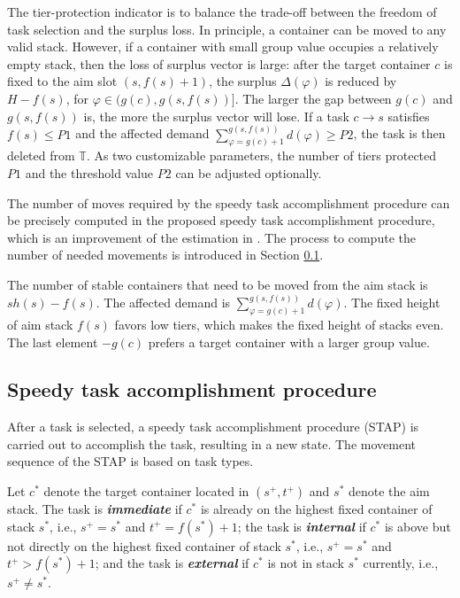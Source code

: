 \documentclass[review,3p,times,12pt,number]{elsarticle}\usepackage{amsmath}\usepackage{amssymb}
\renewcommand{\citet}[1]{\citeauthor{#1} \citep{#1}}
\renewcommand{\emph}[1]{\textbf{\textit{#1}}}
\begin{document}
The tier-protection indicator is to balance the trade-off between the freedom of task selection and the surplus loss. In principle, a container can be moved to any valid stack.
However, if a container with small group value occupies a relatively empty stack, then the loss of surplus vector is large: after the target container $c$ is fixed to the aim slot $(s,f(s)+1)$, the surplus $\Delta(\varphi)$ is reduced by $H-f(s)$, for $\varphi\in (g(c),g(s,f(s))]$.
The larger the gap between $g(c)$ and $g(s,f(s))$ is, the more the surplus vector will lose.
If a task $c\rightarrow s$ satisfies $f(s)\le P1$ and the affected demand $\sum_{\varphi=g(c)+1}^{g(s,f(s))}d(\varphi)\ge P2$,  the task is then deleted from $\mathbb{T}$. As two customizable parameters, the number of tiers protected $P1$ and the threshold value $P2$ can be adjusted optionally.

The number of moves required by the speedy task accomplishment procedure can be precisely computed in the proposed speedy task accomplishment procedure, which is an improvement of the estimation in \citet{wang2015}.
The process to compute the number of needed movements is introduced in Section \ref{sec:speedy}.

The number of stable containers that need to be moved from the aim stack is $\mathit{sh}(s)-f(s)$.
The affected demand is $\sum_{\varphi=g(c)+1}^{g(s,f(s))}d(\varphi)$.
The fixed height of aim stack $f(s)$ favors low tiers, which makes the fixed height of stacks even.
The last element $-g(c)$ prefers a target container with a larger group value.


\subsection{Speedy task accomplishment procedure}

\label{sec:speedy}
After a task is selected, a speedy task accomplishment procedure (STAP) is carried out to accomplish the task, resulting in a new state. The movement sequence of the STAP is based on task types.

Let $c^*$ denote the target container located in $(s^+,t^+)$ and $s^*$ denote the aim stack. The task is \emph{immediate} if $c^*$ is already on the highest fixed container of stack $s^*$, i.e., $s^+=s^*$ and $t^+=f(s^*)+1$;
the task is \emph{internal} if $c^*$ is above but not directly on the highest fixed container of stack $s^*$, i.e., $s^+=s^*$ and $t^+>f(s^*)+1$;
and the task is \emph{external} if $c^*$ is not in stack $s^*$ currently, i.e., $s^+\neq s^*$.
\end{document}
